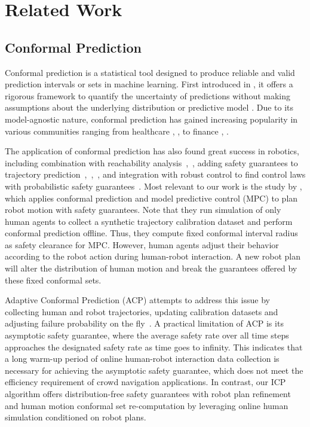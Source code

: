 \section{Related Work}\label{sec-related}
\subsection{Conformal Prediction}
Conformal prediction is a statistical tool designed to produce reliable and 
valid prediction intervals or sets in machine learning. 
First introduced in \cite{vovk2005cp}, it offers 
a rigorous framework to quantify the uncertainty 
of predictions without making assumptions about 
the underlying distribution or predictive model \cite{angelopoulos2022cp}.
Due to its model-agnostic nature, conformal 
prediction has gained increasing popularity in various communities ranging from healthcare \cite{vazquez2022conformal}, \cite{olsson2022estimating},
to finance \cite{pmlr-v128-wisniewski20a}, \cite{KATH2021777}.

The application of conformal prediction has
also found great success in robotics, including combination with reachability analysis~\cite{dietterich2022conformal},~\cite{Muthali2023Multi-agent}, adding safety guarantees to trajectory prediction~\cite{lindemann2023safe},~\cite{dixit2023adaptive},~\cite{Sun2023ConformalPF}, and integration with robust control to find control laws with probabilistic safety guarantees~\cite{zhang2024distributionfree}. Most relevant to our work is the study by 
\cite{lindemann2023safe},
which applies conformal prediction and model predictive control (MPC) to plan robot motion with safety guarantees. Note that they run simulation of only human agents to collect a synthetic trajectory calibration dataset and perform conformal prediction offline. Thus, they compute fixed conformal interval radius as safety clearance for MPC. However, human agents adjust their behavior according to the robot action during human-robot interaction. A new robot plan will alter the distribution of human motion and break the guarantees offered by these fixed conformal sets.

Adaptive Conformal Prediction (ACP) attempts to address this issue by collecting human and robot trajectories, updating calibration datasets and adjusting failure probability on the fly~\cite{dixit2023adaptive}. A practical limitation of ACP is its asymptotic safety guarantee, where the average 
safety rate over all time steps approaches 
the designated safety rate as time goes to infinity. This indicates that a long warm-up period of online human-robot interaction data collection is necessary for achieving the asymptotic safety guarantee, which does not meet the efficiency requirement of crowd navigation applications. In contrast, our ICP algorithm offers distribution-free safety guarantees with robot plan refinement and human motion conformal set re-computation by leveraging online human simulation conditioned on robot plans.


